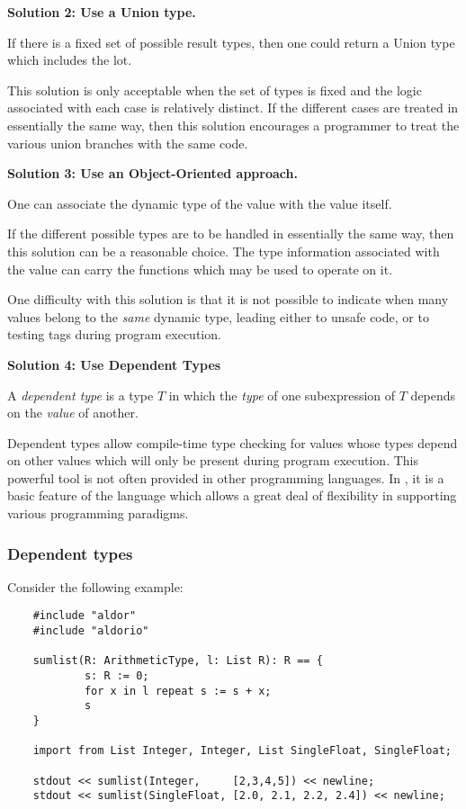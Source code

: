 {\bf Solution 2: Use a Union type.}

If there is a fixed set of possible result types, then one could 
return a Union type which includes the lot.

This solution is only acceptable when the set of types is fixed and the logic
associated with each case is relatively distinct.  If the different cases
are treated in essentially the same way, then this solution encourages
a programmer to treat the various union branches with the same code.

{\bf Solution 3: Use an Object-Oriented approach.}

One can associate the dynamic type of the value with the value itself.

If the different possible types are to be handled in essentially
the same way, then this solution can be a reasonable choice.
The type information associated with the value can carry the functions
which may be used to operate on it.

One difficulty with this solution is that it is not possible to
indicate when many values belong to the {\em same\/} dynamic type,
leading either to unsafe code, or to testing tags during program execution.

{\bf Solution 4: Use Dependent Types}

A {\em dependent type} is a type $T$ in which the {\em type}
of one subexpression of $T$ depends on the {\em value} of another.

Dependent types allow compile-time type checking for values whose types
depend on other values which will only be present during program 
\linebreak
execution.
This powerful tool is not often provided in other programming languages.
In \asharp{}, it is a basic feature of the language which allows a great
deal of flexibility in supporting various programming paradigms.

\subsubsection{Dependent types}

Consider the following example:

\begin{small}
\begin{verbatim}
    #include "aldor"
    #include "aldorio"

    sumlist(R: ArithmeticType, l: List R): R == {
            s: R := 0;
            for x in l repeat s := s + x;
            s
    }

    import from List Integer, Integer, List SingleFloat, SingleFloat;

    stdout << sumlist(Integer,     [2,3,4,5]) << newline;
    stdout << sumlist(SingleFloat, [2.0, 2.1, 2.2, 2.4]) << newline;
\end{verbatim}
\end{small}

